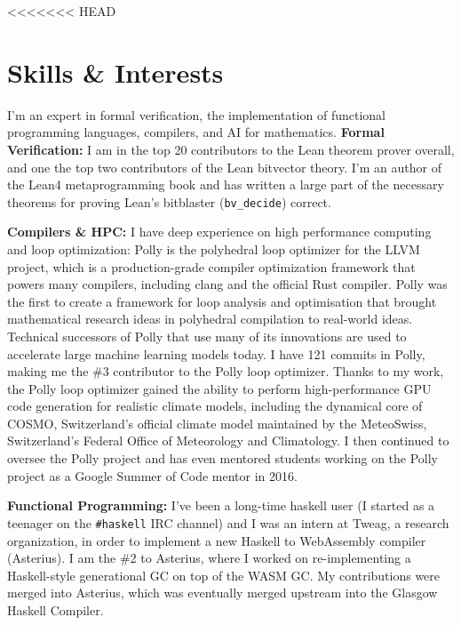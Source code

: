 \documentclass[11pt,a4paper,sans,colorlinks]{moderncv}        %
\begin{document}

<<<<<<< HEAD
\section{Skills \& Interests}

I'm an expert in formal verification, the implementation of functional programming languages, compilers, and AI for mathematics.
\textbf{Formal Verification:}
I am in the top 20 contributors to the Lean theorem prover overall, and one the top two contributors of the Lean bitvector theory.
I'm an author of the Lean4 metaprogramming book and has written a large part of the necessary theorems for proving
Lean's bitblaster (\texttt{bv\_decide}) correct.

\textbf{Compilers \& HPC:} I have deep experience on high performance computing and loop optimization: Polly is the polyhedral loop optimizer for the LLVM project, which is a production-grade compiler optimization framework that powers many compilers, including clang and the official Rust compiler. Polly was the first to create a framework for loop analysis and optimisation that brought mathematical research ideas in polyhedral compilation to real-world ideas. Technical successors of Polly that use many of its innovations are used to accelerate large machine learning models today. I have 121 commits in Polly, making me the \#3 contributor to the Polly loop optimizer. Thanks to my work, the Polly loop optimizer gained the ability to perform high-performance GPU code generation for realistic climate models, including the dynamical core of COSMO, Switzerland's official climate model maintained by the MeteoSwiss, Switzerland's Federal Office of Meteorology and Climatology. I then continued to oversee the Polly project and has even mentored students working on the Polly project as a Google Summer of Code mentor in 2016.

\textbf{Functional Programming:} I've been a long-time haskell user (I started as a teenager on the \texttt{\#haskell} IRC channel) and I was an intern at Tweag, a research organization, in order to implement a new Haskell to WebAssembly compiler (Asterius). I am the \#2 to Asterius, where I worked on re-implementing a Haskell-style generational GC on top of the WASM GC. My contributions were merged into Asterius, which was eventually merged upstream into the Glasgow Haskell Compiler.
\end{document}
